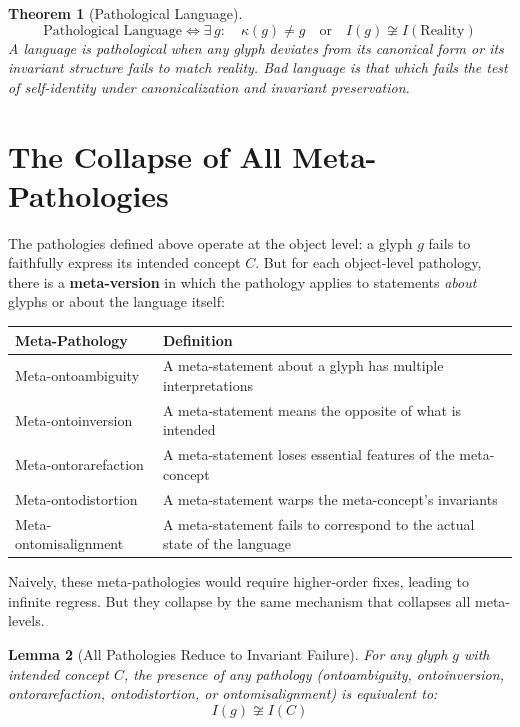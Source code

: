 \documentclass[12pt, letterpaper]{book}
\def\mathfrak#1{#1}%
\newtheorem{theorem}{Theorem}[chapter]
\newtheorem{lemma}[theorem]{Lemma}
\begin{document}
\begin{theorem}[Pathological Language]\label{thm:pathological}
\[
\boxed{\text{Pathological Language} \iff \exists\, \mathfrak{g}: \quad \kappa(\mathfrak{g}) \neq \mathfrak{g} \quad\text{or}\quad I(\mathfrak{g}) \not\cong I(\text{Reality})}
\]
A language is pathological when any glyph deviates from its canonical form or its invariant structure fails to match reality. Bad language is that which fails the test of self-identity under canonicalization and invariant preservation.
\end{theorem}

\section{The Collapse of All Meta-Pathologies}

The pathologies defined above operate at the object level: a glyph $\mathfrak{g}$ fails to faithfully express its intended concept $C$. But for each object-level pathology, there is a \textbf{meta-version} in which the pathology applies to statements \textit{about} glyphs or about the language itself:

\begin{center}
\begin{tabular}{lp{9cm}}
\toprule
\textbf{Meta-Pathology} & \textbf{Definition} \\
\midrule
Meta-ontoambiguity & A meta-statement about a glyph has multiple interpretations \\
Meta-ontoinversion & A meta-statement means the opposite of what is intended \\
Meta-ontorarefaction & A meta-statement loses essential features of the meta-concept \\
Meta-ontodistortion & A meta-statement warps the meta-concept's invariants \\
Meta-ontomisalignment & A meta-statement fails to correspond to the actual state of the language \\
\bottomrule
\end{tabular}
\end{center}

Naively, these meta-pathologies would require higher-order fixes, leading to infinite regress. But they collapse by the same mechanism that collapses all meta-levels.

\begin{lemma}[All Pathologies Reduce to Invariant Failure]\label{lem:path-invariant}
For any glyph $\mathfrak{g}$ with intended concept $C$, the presence of \textit{any} pathology (ontoambiguity, ontoinversion, ontorarefaction, ontodistortion, or ontomisalignment) is equivalent to:
\[
I(\mathfrak{g}) \not\cong I(C)
\]
\end{lemma}
\end{document}
